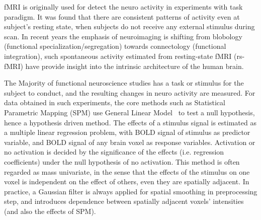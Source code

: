 \documentclass[12pt]{article}
\begin{document}
fMRI is originally used for detect the neuro activity in experiments with task
paradigm. It was found \cite{raichle2001} that there are consistent patterns of
activity even at subject's resting state, when subjects do not receive any
external stimulus during scan. In recent years the emphasis of neuroimaging is
shifting from blobology (functional specialization/segregation) towards
connectology (functional integration)\cite{Smith20121257}, such spontaneous
activity estimated from resting-state fMRI (rs-fMRI) have provide insight into
the intrinsic architecture of the human brain. 









The Majority of functional neuroscience studies has a task or stimulus for the
subject to conduct, and the resulting changes in neuro activity are
measured. For data obtained in such experiments, the core methods such as
Statistical Parametric Mapping (SPM) use General Linear
Model~\cite{worsley_analysis_1995} to test a null hypothesis, hence a hypothesis
driven method. The effects of a stimulus signal is estimated as a multiple
linear regression problem, with BOLD signal of stimulus as predictor variable,
and BOLD signal of any brain voxel as response variables. Activation or no
activation is decided by the significance of the effects (i.e. regression
coefficients) under the null hypothesis of no activation. This method is often
regarded as mass univariate, in the sense that the effects of the stimulus on
one voxel is independent on the effect of others, even they are spatially
adjacent. In practice, a Gaussian filter is always applied for spatial smoothing
in preprocessing step, and introduces dependence between spatially adjacent
voxels' intensities (and also the effects of SPM).
\end{document}
